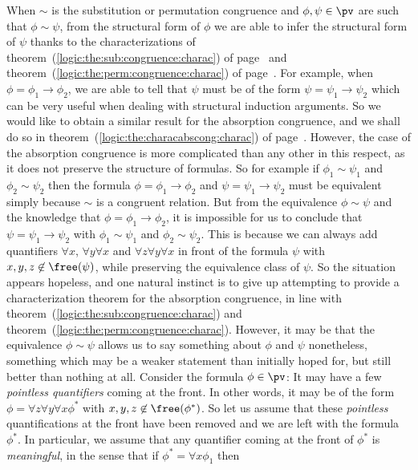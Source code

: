 When $\sim$ is the substitution or permutation congruence and
$\phi,\psi\in\pv$ are such that $\phi\sim\psi$, from the structural
form of $\phi$ we are able to infer the structural form of $\psi$
thanks to the characterizations of
theorem~(\ref{logic:the:sub:congruence:charac}) of
page~\pageref{logic:the:sub:congruence:charac} and
theorem~(\ref{logic:the:perm:congruence:charac}) of
page~\pageref{logic:the:perm:congruence:charac}. For example, when
$\phi=\phi_{1}\to\phi_{2}$, we are able to tell that $\psi$ must be
of the form $\psi=\psi_{1}\to\psi_{2}$ which can be very useful when
dealing with structural induction arguments. So we would like to
obtain a similar result for the absorption congruence, and we shall
do so in theorem~(\ref{logic:the:characabscong:charac}) of
page~\pageref{logic:the:characabscong:charac}. However, the case of
the absorption congruence is more complicated than any other in this
respect, as it does not preserve the structure of formulas. So for
example if $\phi_{1}\sim\psi_{1}$ and $\phi_{2}\sim\psi_{2}$ then
the formula $\phi=\phi_{1}\to\phi_{2}$ and
$\psi=\psi_{1}\to\psi_{2}$ must be equivalent simply because $\sim$
is a congruent relation. But from the equivalence $\phi\sim\psi$ and
the knowledge that $\phi=\phi_{1}\to\phi_{2}$, it is impossible for
us to conclude that $\psi=\psi_{1}\to\psi_{2}$ with
$\phi_{1}\sim\psi_{1}$ and $\phi_{2}\sim\psi_{2}$. This is because
we can always add quantifiers $\forall x$, $\forall y\forall x$ and
$\forall z\forall y\forall x$ in front of the formula $\psi$ with
$x,y,z\not\in\free(\psi)$, while preserving the equivalence class of
$\psi$. So the situation appears hopeless, and one natural instinct
is to give up attempting to provide a characterization theorem for
the absorption congruence, in line with
theorem~(\ref{logic:the:sub:congruence:charac}) and
theorem~(\ref{logic:the:perm:congruence:charac}). However, it may be
that the equivalence $\phi\sim\psi$ allows us to say something about
$\phi$ and $\psi$ nonetheless, something which may be a weaker
statement than initially hoped for, but still better than nothing at
all. Consider the formula $\phi\in\pv$: It may have a few {\em
pointless quantifiers} coming at the front. In other words, it may
be of the form $\phi=\forall z\forall y\forall x\phi^{*}$ with
$x,y,z\not\in\free(\phi^{*})$. So let us assume that these {\em
pointless} quantifications at the front have been removed and we are
left with the formula $\phi^{*}$. In particular, we assume that any
quantifier coming at the front of $\phi^{*}$ is {\em meaningful}, in
the sense that if $\phi^{*}=\forall x\phi_{1}$ then
